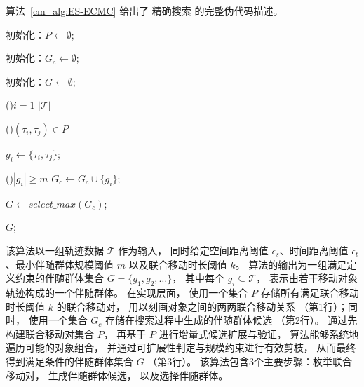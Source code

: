 算法~\ref{cm_alg:ES-ECMC} 给出了 精确搜索 的完整伪代码描述。
\begin{algorithm}[htp]
    \caption{精确搜索算法}
    \label{cm_alg:ES-ECMC}


    \BlankLine
    初始化：$P \leftarrow \emptyset$;

    初始化：$G_c \leftarrow \emptyset$;

    初始化：$G \leftarrow \emptyset$;

    \BlankLine
    \For(){$i = 1$ \KwTo $|\mathcal{T}|$}{
    }

    \BlankLine
    \ForEach(){$(\tau_i,\tau_j) \in P$}{
        $g_i \leftarrow \{\tau_i,\tau_j\}$;


        \If(){$|g_i| \ge m$}{
            $G_c \leftarrow G_c \cup \{g_i\}$;
        }
    }

    \BlankLine
    $G \leftarrow select\_max(G_c)$;

    \Return $G$;
\end{algorithm}


该算法以一组轨迹数据 $\mathcal{T}$ 作为输入， 同时给定空间距离阈值 $\epsilon_s$、时间距离阈值 $\epsilon_t$、最小伴随群体规模阈值 $m$ 以及联合移动时长阈值 $k$。 算法的输出为一组满足定义约束的伴随群体集合
$G=\{g_1,g_2,\ldots\}$， 其中每个 $g_i \subseteq \mathcal{T}$， 表示由若干移动对象轨迹构成的一个伴随群体。 在实现层面， 使用一个集合 $P$ 存储所有满足联合移动时长阈值 $k$ 的联合移动对， 用以刻画对象之间的两两联合移动关系 （第1行）；同时， 使用一个集合 $G_c$ 存储在搜索过程中生成的伴随群体候选 （第2行）。 通过先构建联合移动对集合 $P$， 再基于 $P$ 进行增量式候选扩展与验证， 算法能够系统地遍历可能的对象组合， 并通过可扩展性判定与规模约束进行有效剪枝， 从而最终得到满足条件的伴随群体集合 $G$ （第3行）。 该算法包含3个主要步骤：枚举联合移动对， 生成伴随群体候选， 以及选择伴随群体。

